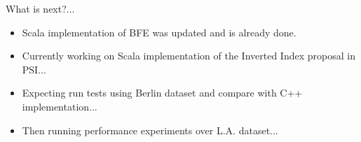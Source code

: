 \documentclass{beamer}
\begin{document}
\begin{frame}{What is next?...}
    \begin{itemize}
        \item Scala implementation of BFE was updated and is already done.
        \item Currently working on Scala implementation of the Inverted Index proposal in PSI...
        \item Expecting run tests using Berlin dataset and compare with C++ implementation...
        \item Then running performance experiments over L.A. dataset...
    \end{itemize}
\end{frame}

\end{document}

